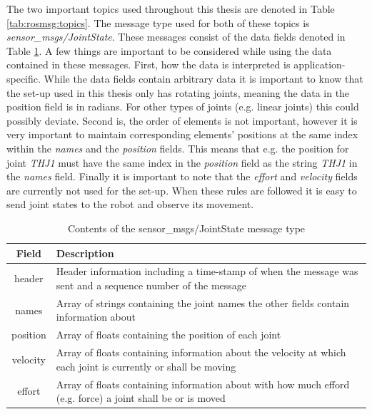 The two important topics used throughout this thesis are denoted in Table \ref{tab:rosmsg:topics}. The message type used for both of these topics is \textit{sensor\_msgs/JointState}. These messages consist of the data fields denoted in Table \ref{tab:rosmsg:contents}. A few things are important to be considered while using the data contained in these messages. First, how the data is interpreted is application-specific. While the data fields contain arbitrary data it is important to know that the set-up used in this thesis only has rotating joints, meaning the data in the position field is in radians. For other types of joints (e.g. linear joints) this could possibly deviate. Second is, the order of elements is not important, however it is very important to maintain corresponding elements' positions at the same index within the \textit{names} and the \textit{position} fields. This means that e.g. the position for joint \textit{THJ1} must have the same index in the \textit{position} field as the string \textit{THJ1} in the \textit{names} field. Finally it is important to note that the \textit{effort} and \textit{velocity} fields are currently not used for the set-up. When these rules are followed it is easy to send joint states to the robot and observe its movement.

\begin{table}
	\caption{\label{tab:rosmsg:contents}Contents of the  \mbox{sensor\_msgs/JointState} message type}
	
	\begin{tabularx}{\linewidth}{|c|X|}
		\hline
		\textbf{Field} & \textbf{Description} \\
		\hline
		header & Header information including a time-stamp of when the message was sent and a sequence number of the message \\
		\hline
		names & Array of strings containing the joint names the other fields contain information about \\
		\hline
		position & Array of floats containing the position of each joint \\
		\hline
		velocity & Array of floats containing information about the velocity at which each joint is currently or shall be moving \\
		\hline
		effort & Array of floats containing information about with how much efford (e.g. force) a joint shall be or is moved \\
		\hline
	\end{tabularx}
\end{table}

